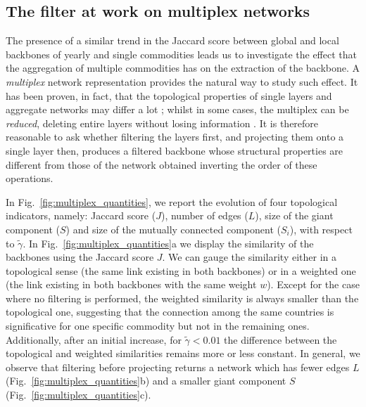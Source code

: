 \documentclass[aps,twocolumn,superscriptaddress]{revtex4-1}
\begin{document}

\subsection{The filter at work on multiplex networks}
The presence of a similar trend in the Jaccard score between global and local backbones of yearly and single commodities leads us to investigate the effect that the aggregation of multiple commodities has on the extraction of the backbone. A \emph{multiplex} network representation \cite{de_domenico-prx-2013, boccaletti-phys_rep-2014} provides the natural way to study such effect. It has been proven, in fact, that the topological properties of single layers and aggregate networks may differ a lot \cite{cardillo-scirep-2013}; whilst in some cases, the multiplex  can be \emph{reduced}, deleting entire layers without losing information \cite{de_domenico-natcomm-2015}. It is therefore reasonable to ask whether filtering the layers first, and projecting them onto a single layer then, produces a filtered backbone whose structural properties are different from those of the network obtained inverting the order of these operations. 

In Fig.~\ref{fig:multiplex_quantities}, we report the evolution of four topological indicators, namely: Jaccard score ($J$), number of edges ($L$), size of the giant component ($S$) and size of the mutually connected component ($S_i$), with respect to $\widetilde{\gamma}$. In Fig.~\ref{fig:multiplex_quantities}a we display the similarity of the backbones using the Jaccard score $J$. We can gauge the similarity either in a topological sense (the same link existing in both backbones) or in a weighted one (the link existing in both backbones with the same weight $w$). Except for the case where no filtering is performed, the weighted similarity is always smaller than the topological one, suggesting that the connection among the same countries is significative for one specific commodity but not in the remaining ones. Additionally, after an initial increase, for $\widetilde{\gamma} < 0.01$ the difference between the topological and weighted similarities remains more or less constant. In general, we observe that filtering before projecting returns a network which has fewer edges $L$ (Fig.~\ref{fig:multiplex_quantities}b) and a smaller giant component $S$ (Fig.~\ref{fig:multiplex_quantities}c).\\
\end{document}
